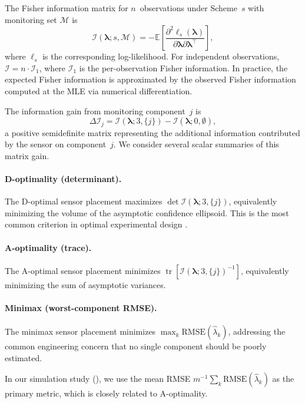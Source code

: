 \documentclass[12pt]{article}
\theoremstyle{definition}
\theoremstyle{remark}
\newcommand{\E}{\mathbb{E}}
\newcommand{\blam}{\boldsymbol{\lambda}}
\DeclareMathOperator{\tr}{tr}
\begin{document}
The Fisher information matrix for $n$~observations under Scheme~$s$
with monitoring set $\mathcal{M}$ is
\begin{equation}\label{eq:fisher-general}
  \mathcal{I}(\blam; s, \mathcal{M}) = -\E\!\left[
    \frac{\partial^2 \ell_s(\blam)}{\partial \blam \partial \blam^\top}
  \right],
\end{equation}
where $\ell_s$ is the corresponding log-likelihood.  For independent
observations, $\mathcal{I} = n \cdot \mathcal{I}_1$, where
$\mathcal{I}_1$ is the per-observation Fisher information.  In practice,
the expected Fisher information is approximated by the observed Fisher
information computed at the MLE via numerical differentiation.

The information gain from monitoring component~$j$ is
\begin{equation}\label{eq:info-gain}
  \Delta \mathcal{I}_j = \mathcal{I}(\blam; 3, \{j\}) - \mathcal{I}(\blam; 0, \emptyset),
\end{equation}
a positive semidefinite matrix representing the additional information
contributed by the sensor on component~$j$.  We consider several
scalar summaries of this matrix gain.

\paragraph{D-optimality (determinant).}
The D-optimal sensor placement maximizes $\det \mathcal{I}(\blam; 3, \{j\})$,
equivalently minimizing the volume of the asymptotic confidence ellipsoid.
This is the most common criterion in optimal experimental design
\citep{Atkinson2007}.

\paragraph{A-optimality (trace).}
The A-optimal sensor placement minimizes $\tr[\mathcal{I}(\blam; 3, \{j\})^{-1}]$,
equivalently minimizing the sum of asymptotic variances.

\paragraph{Minimax (worst-component RMSE).}
The minimax sensor placement minimizes
$\max_k \mathrm{RMSE}(\hat{\lambda}_k)$, addressing the common
engineering concern that no single component should be poorly estimated.

In our simulation study (), we use the
mean RMSE $m^{-1}\sum_k \mathrm{RMSE}(\hat\lambda_k)$ as the primary
metric, which is closely related to A-optimality.
\end{document}
